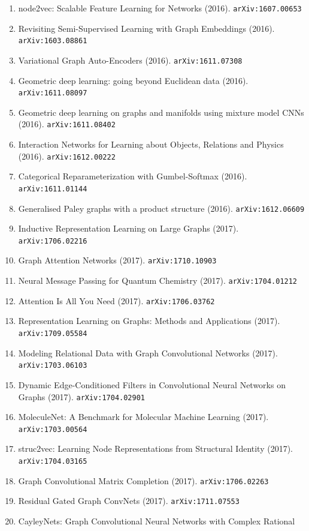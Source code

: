 \documentclass[11pt]{article}
\begin{document}
\begin{enumerate}
  \item node2vec: Scalable Feature Learning for Networks (2016). \texttt{arXiv:1607.00653}
  \item Revisiting Semi-Supervised Learning with Graph Embeddings (2016). \texttt{arXiv:1603.08861}
  \item Variational Graph Auto-Encoders (2016). \texttt{arXiv:1611.07308}
  \item Geometric deep learning: going beyond Euclidean data (2016). \texttt{arXiv:1611.08097}
  \item Geometric deep learning on graphs and manifolds using mixture model CNNs (2016). \texttt{arXiv:1611.08402}
  \item Interaction Networks for Learning about Objects, Relations and Physics (2016). \texttt{arXiv:1612.00222}
  \item Categorical Reparameterization with Gumbel-Softmax (2016). \texttt{arXiv:1611.01144}
  \item Generalised Paley graphs with a product structure (2016). \texttt{arXiv:1612.06609}
  \item Inductive Representation Learning on Large Graphs (2017). \texttt{arXiv:1706.02216}
  \item Graph Attention Networks (2017). \texttt{arXiv:1710.10903}
  \item Neural Message Passing for Quantum Chemistry (2017). \texttt{arXiv:1704.01212}
  \item Attention Is All You Need (2017). \texttt{arXiv:1706.03762}
  \item Representation Learning on Graphs: Methods and Applications (2017). \texttt{arXiv:1709.05584}
  \item Modeling Relational Data with Graph Convolutional Networks (2017). \texttt{arXiv:1703.06103}
  \item Dynamic Edge-Conditioned Filters in Convolutional Neural Networks on
  Graphs (2017). \texttt{arXiv:1704.02901}
  \item MoleculeNet: A Benchmark for Molecular Machine Learning (2017). \texttt{arXiv:1703.00564}
  \item struc2vec: Learning Node Representations from Structural Identity (2017). \texttt{arXiv:1704.03165}
  \item Graph Convolutional Matrix Completion (2017). \texttt{arXiv:1706.02263}
  \item Residual Gated Graph ConvNets (2017). \texttt{arXiv:1711.07553}
  \item CayleyNets: Graph Convolutional Neural Networks with Complex Rational

\end{enumerate}
\end{document}
